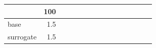 \begin{tabular}{lrrrrrrrrrrrrrr}
\toprule
{}  &  100 \\
\midrule
base      &  1.5 \\
surrogate &  1.5 \\
\bottomrule
\end{tabular}
